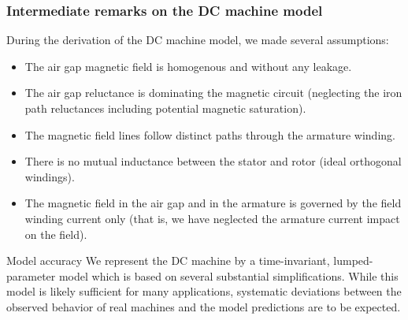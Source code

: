 \begin{frame}
	\frametitle{Intermediate remarks on the DC machine model} 
	During the derivation of the DC machine model, we made several assumptions:
	\begin{itemize}
		\item The air gap magnetic field is homogenous and without any leakage. \pause
		\item The air gap reluctance is dominating the magnetic circuit (neglecting the iron path reluctances including potential magnetic saturation).\pause
		\item The magnetic field lines follow distinct paths through the armature winding. \pause
		\item There is no mutual inductance between the stator and rotor (ideal orthogonal windings). \pause
		\item The magnetic field in the air gap and in the armature is governed by the field winding current only (that is, we have neglected the armature current impact on the field). \pause
	\end{itemize}
	\begin{varblock}{Model accuracy}
		We represent the DC machine by a time-invariant, lumped-parameter model which is based on several substantial simplifications. While this model is likely sufficient for many applications, systematic deviations between the observed behavior of real machines and the model predictions are to be expected.
	\end{varblock}
\end{frame}

